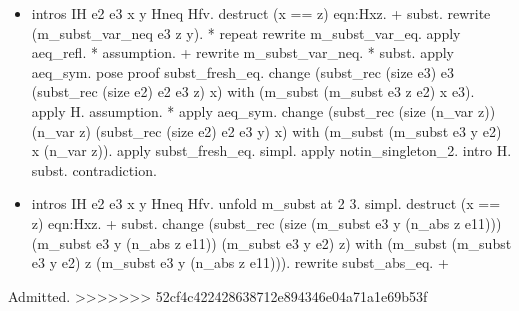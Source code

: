 \begin{itemize}
\item      intros IH e2 e3 x y Hneq Hfv. destruct (x == z) eqn:Hxz.
    +       subst. rewrite (m\_subst\_var\_neq e3 z y).
      * repeat rewrite m\_subst\_var\_eq. apply aeq\_refl.
      * assumption.
    + rewrite m\_subst\_var\_neq.
      *         subst. apply aeq\_sym. pose proof subst\_fresh\_eq. change (subst\_rec (size e3) e3 (subst\_rec (size e2) e2 e3 z) x) with (m\_subst (m\_subst e3 z e2) x e3). apply H. assumption.
      *         apply aeq\_sym. change (subst\_rec (size (n\_var z)) (n\_var z) (subst\_rec (size e2) e2 e3 y) x) with (m\_subst (m\_subst e3 y e2) x (n\_var z)). apply subst\_fresh\_eq. simpl. apply notin\_singleton\_2. intro H. subst. contradiction.

\item      intros IH e2 e3 x y Hneq Hfv. unfold m\_subst at 2 3. simpl. destruct (x == z) eqn:Hxz.
    +       subst. change (subst\_rec (size (m\_subst e3 y (n\_abs z e11))) (m\_subst e3 y (n\_abs z e11)) (m\_subst e3 y e2) z) with (m\_subst (m\_subst e3 y e2) z (m\_subst e3 y (n\_abs z e11))). rewrite subst\_abs\_eq.
    +

\end{itemize}
Admitted.
>>>>>>> 52cf4c422428638712e894346e04a71a1e69b53f 
\begin{coqdoccode}
\coqdocemptyline
\end{coqdoccode}
